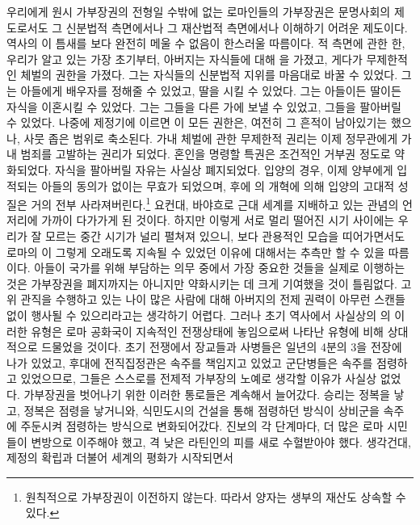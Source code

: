 우리에게 원시 가부장권의 전형일 수밖에 없는
로마인들의 가부장권은
문명사회의 제도로서도
그 신분법적 측면에서나 그 재산법적 측면에서나
이해하기 어려운 제도이다.
역사의 이 틈새를 보다 완전히 메울 수 없음이 한스러울 따름이다.
적 측면에 관한 한,
우리가 알고 있는 가장 초기부터,
아버지는 자식들에 대해 을 가졌고,
게다가 무제한적인 체벌의 권한을 가졌다.
그는 자식들의 신분법적 지위를 마음대로 바꿀 수 있었다.
그는 아들에게 배우자를 정해줄 수 있었고, 딸을 시킬 수 있었다.
그는 아들이든 딸이든 자식을 이혼시킬 수 있었다.
그는 그들을 다른 가에 보낼 수 있었고, 그들을 팔아버릴 수 있었다.
나중에 제정기에 이르면 이 모든 권한은, 여전히 그 흔적이 남아있기는 했으나,
사뭇 좁은 범위로 축소된다.
가내 체벌에 관한 무제한적 권리는 이제
정무관에게 가내 범죄를 고발하는 권리가 되었다.
혼인을 명령할 특권은 조건적인 거부권 정도로 약화되었다.
자식을 팔아버릴 자유는 사실상 폐지되었다.
입양의 경우, 이제 양부에게 입적되는 아들의 동의가 없이는
무효가 되었으며, 후에 의 개혁에 의해
입양의 고대적 성질은 거의 전부 사라져버린다.\footnote{%
  원칙적으로 가부장권이 이전하지 않는다.
  따라서 양자는 생부의 재산도 상속할 수 있다. }
요컨대, 바야흐로 근대 세계를 지배하고 있는 관념의 언저리에
가까이 다가가게 된 것이다.
하지만 이렇게 서로 멀리 떨어진 시기 사이에는 우리가 잘 모르는
중간 시기가 널리 펼쳐져 있으니,
보다 관용적인 모습을 띠어가면서도
로마의 이
그렇게 오래도록 지속될 수 있었던
이유에 대해서는 추측만 할 수 있을 따름이다.
아들이 국가를 위해 부담하는 의무 중에서 가장 중요한 것들을
실제로 이행하는 것은 가부장권을 폐지까지는 아니지만 약화시키는 데
크게 기여했을 것이 틀림없다.
고위 관직을 수행하고 있는 나이 많은 사람에 대해
아버지의 전제 권력이 아무런 스캔들 없이 행사될 수 있으리라고는
생각하기 어렵다.
그러나
초기 역사에서
사실상의 의 이러한 유형은
로마 공화국이 지속적인 전쟁상태에 놓임으로써 나타난 유형에 비해
상대적으로 드물었을 것이다.
초기 전쟁에서 장교들과 사병들은 일년의 4분의 3을 전장에 나가 있었고,
후대에 전직집정관은 속주를 책임지고 있었고
군단병들은 속주를 점령하고 있었으므로,
그들은 스스로를 전제적 가부장의 노예로 생각할 이유가 사실상 없었다.
가부장권을 벗어나기 위한 이러한 통로들은 계속해서 늘어갔다.
승리는 정복을 낳고, 정복은 점령을 낳거니와,
식민도시의 건설을 통해 점령하던 방식이
상비군을 속주에 주둔시켜 점령하는 방식으로
변화되어갔다.
진보의 각 단계마다,
더 많은 로마 시민들이 변방으로 이주해야 했고,
격 낮은 라틴인의 피를 새로 수혈받아야 했다.
생각건대,
제정의 확립과 더불어 세계의 평화가 시작되면서
